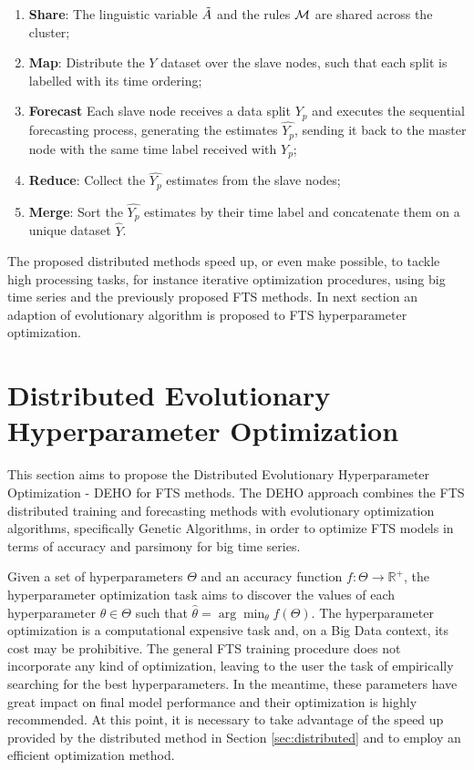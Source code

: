  \begin{enumerate}
    \item \textbf{Share}: The linguistic variable $\tilde{A}$ and the rules $\mathcal{M}$ are shared across the cluster; 
    \item \textbf{Map}: Distribute the $Y$ dataset over the slave nodes, such that each split is labelled with its time ordering;
    \item \textbf{Forecast} Each slave node receives a data split $Y_p$ and executes the sequential forecasting process, generating the estimates $\hat{Y_p}$, sending it back to the master node with the same time label received with $Y_p$;
    \item \textbf{Reduce}: Collect the $\hat{Y_p}$ estimates from the slave nodes;
    \item \textbf{Merge}: Sort the $\hat{Y_p}$ estimates by their time label and concatenate them on a unique dataset $\hat{Y}$.
\end{enumerate}


The proposed distributed methods speed up, or even make possible, to tackle high processing tasks, for instance iterative optimization procedures, using big time series and the previously proposed FTS methods. In next section an adaption of evolutionary algorithm is proposed to FTS hyperparameter optimization. 


\section{Distributed Evolutionary Hyperparameter Optimization}
\label{sec:hyperparameter}

This section aims to propose the Distributed Evolutionary Hyperparameter Optimization - DEHO for FTS methods. The DEHO approach combines the FTS distributed training and forecasting methods with evolutionary optimization algorithms, specifically Genetic Algorithms, in order to optimize FTS models in terms of accuracy and parsimony for big time series.

Given a set of hyperparameters $\Theta$ and an accuracy function $f: \Theta \rightarrow \mathbb{R}^+$, the hyperparameter optimization task aims to discover the values of each hyperparameter $\theta \in \Theta$ such that $\hat{\theta} = \arg\min_\theta f(\Theta)$. The hyperparameter optimization is a computational expensive task and, on a Big Data context, its cost may be prohibitive. The general FTS training procedure does not incorporate any kind of optimization, leaving to the user the task of empirically searching for the best hyperparameters. In the meantime, these parameters have great impact on final model performance and their optimization is highly recommended. At this point, it is necessary to take advantage of the speed up provided by the distributed method in Section \ref{sec:distributed} and to employ an efficient optimization method. 

